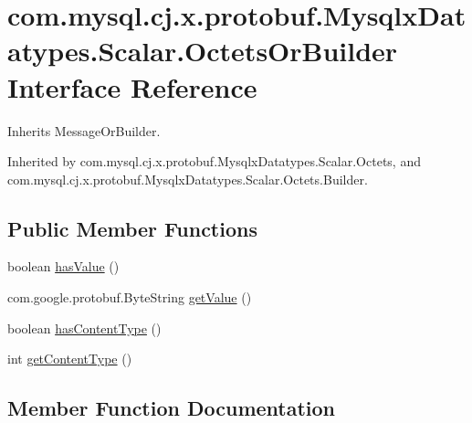 \hypertarget{interfacecom_1_1mysql_1_1cj_1_1x_1_1protobuf_1_1_mysqlx_datatypes_1_1_scalar_1_1_octets_or_builder}{}\section{com.\+mysql.\+cj.\+x.\+protobuf.\+Mysqlx\+Datatypes.\+Scalar.\+Octets\+Or\+Builder Interface Reference}
\label{interfacecom_1_1mysql_1_1cj_1_1x_1_1protobuf_1_1_mysqlx_datatypes_1_1_scalar_1_1_octets_or_builder}


Inherits Message\+Or\+Builder.



Inherited by com.\+mysql.\+cj.\+x.\+protobuf.\+Mysqlx\+Datatypes.\+Scalar.\+Octets, and com.\+mysql.\+cj.\+x.\+protobuf.\+Mysqlx\+Datatypes.\+Scalar.\+Octets.\+Builder.

\subsection*{Public Member Functions}
\begin{DoxyCompactItemize}
\item 
boolean \mbox{\hyperlink{interfacecom_1_1mysql_1_1cj_1_1x_1_1protobuf_1_1_mysqlx_datatypes_1_1_scalar_1_1_octets_or_builder_a2596e5239331a6c435e18f17db0069fe}{has\+Value}} ()
\item 
com.\+google.\+protobuf.\+Byte\+String \mbox{\hyperlink{interfacecom_1_1mysql_1_1cj_1_1x_1_1protobuf_1_1_mysqlx_datatypes_1_1_scalar_1_1_octets_or_builder_a4fe6bcfc08dd5b607744c6fb68e21b89}{get\+Value}} ()
\item 
boolean \mbox{\hyperlink{interfacecom_1_1mysql_1_1cj_1_1x_1_1protobuf_1_1_mysqlx_datatypes_1_1_scalar_1_1_octets_or_builder_aac766b7cb2f00423835d41ea50948010}{has\+Content\+Type}} ()
\item 
int \mbox{\hyperlink{interfacecom_1_1mysql_1_1cj_1_1x_1_1protobuf_1_1_mysqlx_datatypes_1_1_scalar_1_1_octets_or_builder_af879a7b0750916b8e60fa8db14720984}{get\+Content\+Type}} ()
\end{DoxyCompactItemize}


\subsection{Member Function Documentation}
\mbox{\label{interfacecom_1_1mysql_1_1cj_1_1x_1_1protobuf_1_1_mysqlx_datatypes_1_1_scalar_1_1_octets_or_builder_af879a7b0750916b8e60fa8db14720984}} 
